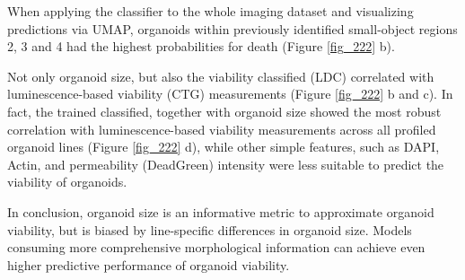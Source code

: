 \begin{flushleft}
\bigbreak
When applying the classifier to the whole imaging dataset and visualizing predictions via UMAP, organoids within previously identified small-object regions 2, 3 and 4 had the highest probabilities for death (Figure \ref{fig_222} b). 

\bigbreak
Not only organoid size, but also the viability classified (LDC) correlated with luminescence-based viability (CTG) measurements (Figure \ref{fig_222} b and c). In fact, the trained classified, together with organoid size showed the most robust correlation with luminescence-based viability measurements across all profiled organoid lines (Figure \ref{fig_222} d), while other simple features, such as DAPI, Actin, and permeability (DeadGreen) intensity were less suitable to predict the viability of organoids. 

\bigbreak
In conclusion, organoid size is an informative metric to approximate organoid viability, but is biased by line-specific differences in organoid size. Models consuming more comprehensive morphological information can achieve even higher predictive performance of organoid viability. 


\end{flushleft}
